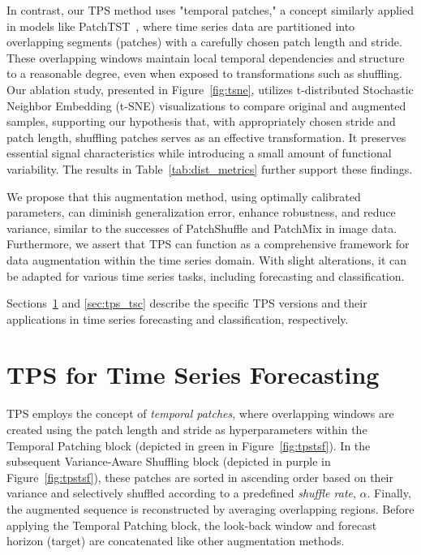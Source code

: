 In contrast, our TPS method uses "temporal patches," a concept similarly applied in models like PatchTST~\cite{nie2023timeseriesworth64}, where time series data are partitioned into overlapping segments (patches) with a carefully chosen patch length and stride. These overlapping windows maintain local temporal dependencies and structure to a reasonable degree, even when exposed to transformations such as shuffling. Our ablation study, presented in Figure~\ref{fig:tsne}, utilizes t-distributed Stochastic Neighbor Embedding (t-SNE) visualizations to compare original and augmented samples, supporting our hypothesis that, with appropriately chosen stride and patch length, shuffling patches serves as an effective transformation. It preserves essential signal characteristics while introducing a small amount of functional variability. The results in Table~\ref{tab:dist_metrics} further support these findings.



We propose that this augmentation method, using optimally calibrated parameters, can diminish generalization error, enhance robustness, and reduce variance, similar to the successes of PatchShuffle and PatchMix in image data. Furthermore, we assert that TPS can function as a comprehensive framework for data augmentation within the time series domain. With slight alterations, it can be adapted for various time series tasks, including forecasting and classification.

Sections~\ref{sec: tps_tsf} and \ref{sec:tps_tsc}  describe the specific TPS versions and their applications in time series forecasting and classification, respectively.



\section{TPS for Time Series Forecasting} \label{sec: tps_tsf}



TPS employs the concept of \textit{temporal patches}, where overlapping windows are created using the patch length and stride as hyperparameters within the Temporal Patching block (depicted in green in Figure~\ref{fig:tpstsf}). In the subsequent Variance-Aware Shuffling block (depicted in purple in Figure~\ref{fig:tpstsf}), these patches are sorted in ascending order based on their variance and selectively shuffled according to a predefined \textit{shuffle rate}, $\alpha$. Finally, the augmented sequence is reconstructed by averaging overlapping regions. Before applying the Temporal Patching block, the look-back window and forecast horizon (target) are concatenated like other augmentation methods.


